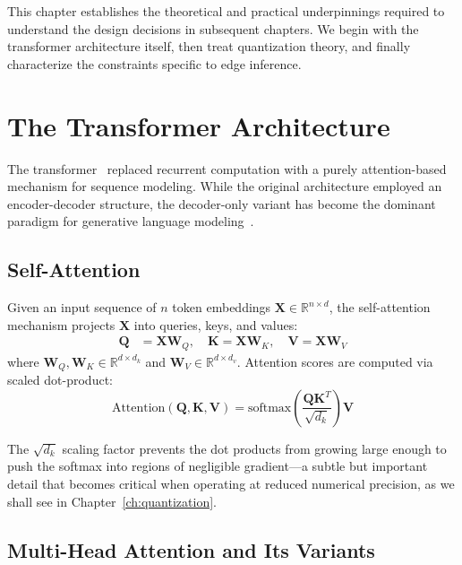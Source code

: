 \documentclass[12pt, letterpaper, twoside]{report}
\begin{document}
This chapter establishes the theoretical and practical underpinnings required to understand the design decisions in subsequent chapters. We begin with the transformer architecture itself, then treat quantization theory, and finally characterize the constraints specific to edge inference.

\section{The Transformer Architecture}
\label{sec:transformer}

The transformer~\cite{vaswani2017attention} replaced recurrent computation with a purely attention-based mechanism for sequence modeling. While the original architecture employed an encoder-decoder structure, the decoder-only variant has become the dominant paradigm for generative language modeling~\cite{radford2019language, brown2020language}.

\subsection{Self-Attention}
\label{subsec:self_attention}

Given an input sequence of $n$ token embeddings $\mathbf{X} \in \mathbb{R}^{n \times d}$, the self-attention mechanism projects $\mathbf{X}$ into queries, keys, and values:
\begin{align}
\mathbf{Q} &= \mathbf{X}\mathbf{W}_Q, \quad \mathbf{K} = \mathbf{X}\mathbf{W}_K, \quad \mathbf{V} = \mathbf{X}\mathbf{W}_V \label{eq:qkv}
\end{align}
where $\mathbf{W}_Q, \mathbf{W}_K \in \mathbb{R}^{d \times d_k}$ and $\mathbf{W}_V \in \mathbb{R}^{d \times d_v}$. Attention scores are computed via scaled dot-product:
\begin{equation}
\text{Attention}(\mathbf{Q}, \mathbf{K}, \mathbf{V}) = \text{softmax}\left(\frac{\mathbf{Q}\mathbf{K}^T}{\sqrt{d_k}}\right)\mathbf{V}
\label{eq:attention}
\end{equation}

The $\sqrt{d_k}$ scaling factor prevents the dot products from growing large enough to push the softmax into regions of negligible gradient---a subtle but important detail that becomes critical when operating at reduced numerical precision, as we shall see in Chapter~\ref{ch:quantization}.

\subsection{Multi-Head Attention and Its Variants}
\label{subsec:mha}
\end{document}
